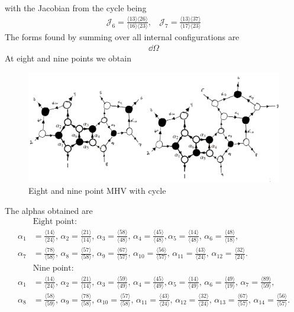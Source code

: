 \documentclass[letter,11pt]{article}
\newcommand{\J}{\mathcal{J}}
\newcommand{\ab}[1]{\langle #1 \rangle}
\begin{document}
with the Jacobian from the cycle being
\begin{equation}
	\begin{aligned}
		\J_6=\frac{\ab{13}\ab{26}}{\ab{16}\ab{23}},~~~~
		\J_7=\frac{\ab{13}\ab{37}}{\ab{17}\ab{23}}
	\end{aligned}
\end{equation}
The forms found by summing over all internal configurations are
\begin{equation}
	\begin{aligned}
		\dd \Omega 
	\end{aligned}
\end{equation}
At eight and nine points we obtain
\begin{figure}[H]
	\centering
	\includegraphics[width=0.7\linewidth]{8+9pt}
	\caption{Eight and nine point MHV with cycle}
	\label{fig:two-loop}
\end{figure}
\noindent
The alphas obtained are
\begin{equation}
	\begin{aligned}
		&\text{Eight point}:\\
	\alpha_1&=\frac{\ab{14}}{\ab{24}},\,\alpha_2=\frac{\ab{21}}{\ab{14}},\,\alpha_3=\frac{\ab{58}}{\ab{48}},\,\alpha_4=\frac{\ab{45}}{\ab{48}},\alpha_5=\frac{\ab{14}}{\ab{48}},\,
	\alpha_6=\frac{\ab{48}}{\ab{18}},\\
	\alpha_7&=\frac{\ab{78}}{\ab{58}},\,\alpha_8=\frac{\ab{57}}{\ab{58}},\,\alpha_9=\frac{\ab{67}}{\ab{57}},\,\alpha_{10}=\frac{\ab{56}}{\ab{57}}
	,\,\alpha_{11}=\frac{\ab{43}}{\ab{24}}
	,\,\alpha_{12}=\frac{\ab{32}}{\ab{24}}
	.\\
		&\text{Nine point}:\\
		\alpha_1&=\frac{\ab{14}}{\ab{24}},\,\alpha_2=\frac{\ab{21}}{\ab{14}},\,\alpha_3=\frac{\ab{59}}{\ab{49}},\,\alpha_4=\frac{\ab{45}}{\ab{49}},\alpha_5=\frac{\ab{14}}{\ab{49}},\,
	\alpha_6=\frac{\ab{49}}{\ab{19}},\,
	\alpha_7=\frac{\ab{89}}{\ab{59}},\\
	\alpha_8&=\frac{\ab{58}}{\ab{59}},\,\alpha_9=\frac{\ab{78}}{\ab{58}},\,\alpha_{10}=\frac{\ab{57}}{\ab{58}}
	,\,\alpha_{11}=\frac{\ab{43}}{\ab{24}}
	,\,\alpha_{12}=\frac{\ab{32}}{\ab{24}}
	,\,\alpha_{13}=\frac{\ab{67}}{\ab{57}}
	,\,\alpha_{14}=\frac{\ab{56}}{\ab{57}}
	.
	\end{aligned}
\end{equation}
\end{document}
